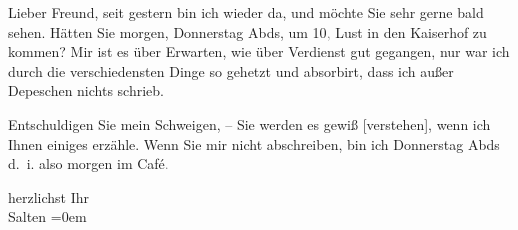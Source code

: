            \vspace{0.5em}
\pstart
           Lieber Freund, seit gestern bin ich
               wieder da, und möchte Sie sehr gerne bald sehen. Hätten Sie morgen, Donnerstag{ }Abds, um 10\textcolor{gray}{,} Lust in den Kaiserhof zu
               kommen? Mir ist es über Erwarten, wie über Verdienst gut gegangen, nur war ich durch
               die verschiedensten Dinge so gehetzt und absorbirt, dass ich außer Depeschen nichts
               schrieb.\pend
           
\pstart
           Entschuldigen Sie mein Schweigen, – Sie werden es
               gewiß {[}verstehen{]}, wenn ich Ihnen einiges erzähle. Wenn Sie mir
               nicht abschreiben, bin ich Donnerstag{ }Abds d. i. also morgen im Café\textcolor{gray}{.}\pend
           
\pstart
           herzlichst Ihr {\\[\baselineskip]}\spacefill\mbox{Salten}\pend
           \leftskip=0em{}\endnumbering{}  \newcommand{\dateiname}{L03337}\newcommand{\titel}{Felix Salten an Arthur Schnitzler, [3. 12.? 1902]}\newcommand{\editorInnen}{Martin Anton Müller und Laura Untner}
